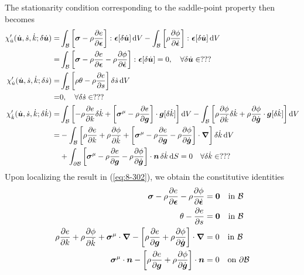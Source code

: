 The stationarity condition corresponding to the saddle-point property then becomes
\begin{subequations}\label{eq:8-302}
    \begin{align}
    \chi'_{\dot{u}}(\dot{\bm {u}},\dot{s},\dot{k};\delta\dot{\bm {u}})
    =&
    \int_{\mathcal{B}}  \left[\bm{\sigma} - \rho\frac{\partial e}{\partial \bm{\epsilon}}\right] \colon \bm{\epsilon}[\delta\dot{\bm {u}}]  \mathop{}\!\mathrm{d} V - 
    \int_{\mathcal{B}}  \left[\rho\frac{\partial \phi}{\partial \dot{\bm{\epsilon}}}\right] \colon \bm{\epsilon}[\delta\dot{\bm {u}}]  \mathop{}\!\mathrm{d} V
    \nonumber \\
    =&
    \int_{\mathcal{B}} \left[\bm{\sigma} - \rho\frac{\partial e}{\partial \bm{\epsilon}} -  
    \rho\frac{\partial \phi}{\partial \dot{\bm{\epsilon}}} \right] \colon \bm{\epsilon}[\delta\dot{\bm {u}}]  = 0,
    \quad \forall \delta\dot{\bm {u}}\in ???
\label{eq:8-302a}\\
    \chi'_{\dot{u}}(\dot{\bm {u}},\dot{s},\dot{k};\delta\dot{s})
    =&
    \int_{\mathcal{B}}  \left[\rho\theta - \rho\frac{\partial e}{\partial s}\right] \delta\dot{s}  \mathop{}\!\mathrm{d} V
    \nonumber \\
    =&
    0,
    \quad \forall \delta\dot{s}\in ???
\label{eq:8-302b}\\
    \chi'_{\dot{k}}(\dot{\bm {u}},\dot{s},\dot{k};\delta\dot{k})
    =&
    \int_{\mathcal{B}}  \left[-\rho\frac{\partial e}{\partial k} \delta\dot{k} + \left[\bm{\sigma}^{\mathrm{\mu}} - 
    \rho\frac{\partial e}{\partial \bm {g}}\right] \cdot \bm {g}[\delta\dot{k}]\right]  \mathop{}\!\mathrm{d} V -
    \int_{\mathcal{B}}  \left[\rho\frac{\partial \phi}{\partial \dot{k}} \delta\dot{k} + 
    \rho\frac{\partial \phi}{\partial \dot{\bm {g}}} \cdot \bm {g}[\delta\dot{k}]\right]  \mathop{}\!\mathrm{d} V
    \nonumber \\
    =&
     -\int_{\mathcal{B}} \left[\rho\frac{\partial e}{\partial k} + 
     \rho\frac{\partial \phi}{\partial \dot{k}} +
     \left[\bm{\sigma}^{\mathrm{\mu}} - \rho\frac{\partial e}{\partial \bm {g}} - 
     \rho\frac{\partial \phi}{\partial \dot{\bm {g}}}\right] \cdot {\bm\nabla}\right]\delta\dot{k} \mathop{}\!\mathrm{d} V
    \nonumber \\
     &+ \int_{\partial\mathcal{B}} \left[\bm{\sigma}^{\mathrm{\mu}} - \rho\frac{\partial e}{\partial \bm {g}} - 
     \rho\frac{\partial \phi}{\partial \dot{\bm {g}}}\right] \cdot \bm{n}\, \delta\dot{k}\mathop{}\!\mathrm{d} S = 0
    \quad \forall \delta\dot{k}\in ???
\label{eq:8-302c}
    \end{align}
\end{subequations}
Upon localizing the result in (\ref{eq:8-302}), we obtain 
the constitutive identities
\begin{subequations}\label{eq:8-303}
    \begin{align}
    \bm{\sigma} - \rho \frac{\partial e}{\partial \bm{\epsilon}} -  
    \rho \frac{\partial \phi}{\partial \dot{\bm{\epsilon}}} &= \bm{0} \quad
    \mbox{in } \mathcal{B}
\label{eq:8-303a}\\
    \theta - \frac{\partial e}{\partial s} &= \bm{0} \quad
    \mbox{in } \mathcal{B}
\label{eq:8-303b}\\
    \rho\frac{\partial e}{\partial k} + \rho\frac{\partial \phi}{\partial \dot{k}} +
    \bm{\sigma}^{\mathrm{\mu}} \cdot {\bm\nabla} - \left[\rho\frac{\partial e}{\partial \bm {g}} + 
    \rho\frac{\partial \phi}{\partial \dot{\bm {g}}}\right] \cdot {\bm\nabla} &= 0 \quad
    \mbox{in }  \mathcal{B}
\label{eq:8-303c} \\
    \bm{\sigma}^{\mathrm{\mu}} \cdot \bm{n} - \left[\rho\frac{\partial e}{\partial \bm {g}} + 
    \rho\frac{\partial \phi}{\partial \dot{\bm {g}}}\right] \cdot \bm{n} &= 0 \quad
    \mbox{on }  \partial\mathcal{B}
\label{eq:8-303d}
    \end{align}
\end{subequations}
